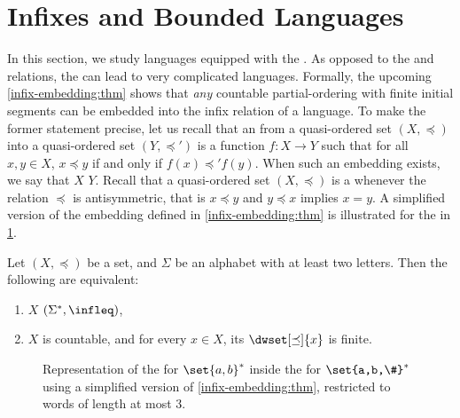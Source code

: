 \section{Infixes and Bounded Languages}
\label{infixes-regular:sec}

\AP In this section, we study languages equipped with the .
As opposed to the  and  relations, the  can lead to very complicated  languages.
Formally, the upcoming \cref{infix-embedding:thm} shows that
\emph{any} countable partial-ordering with finite initial segments can be
embedded into the infix relation of a language. To make the former statement
precise, let us recall that an  from a quasi-ordered set
$(X, \preceq)$ into a quasi-ordered set $(Y, \preceq')$ is a function $f \colon
X \to Y$ such that for all $x, y \in X$, $x \preceq y$ if and only if $f(x)
\preceq' f(y)$. When such an embedding exists, we say that $X$  $Y$. Recall that a quasi-ordered set $(X, \preceq)$ is a  whenever the relation $\preceq$ is antisymmetric, that is $x \preceq
y$ and $y \preceq x$ implies $x = y$. 
A simplified version of the embedding defined in \cref{infix-embedding:thm} is illustrated
for the  in \cref{infix-embedding:fig}.
\begin{lemma}{\cite[Lemma 5.1]{DBLP:journals/ita/Kuske06}}
    \label{infix-embedding:thm}
    Let $(X, \preceq)$ be a  set,
    and $\Sigma$ be an alphabet with at least two letters.
    Then the following are equivalent:
    \begin{enumerate}
        \item 
            $X$  $(\Sigma^*, \infleq)$,
        \item 
            $X$ is countable, and for every $x \in X$,
            its 
            $\dwset[\preceq]{x}$ is finite.
    \end{enumerate}
\end{lemma}
\begin{figure}
    \centering
    
    \caption{Representation of the  for $\set{a,b}^*$
        inside the  for $\set{a,b,\#}^*$
        using a simplified version of \cref{infix-embedding:thm}, restricted to words
        of length at most $3$. 
    }
    \label{infix-embedding:fig}
\end{figure}

